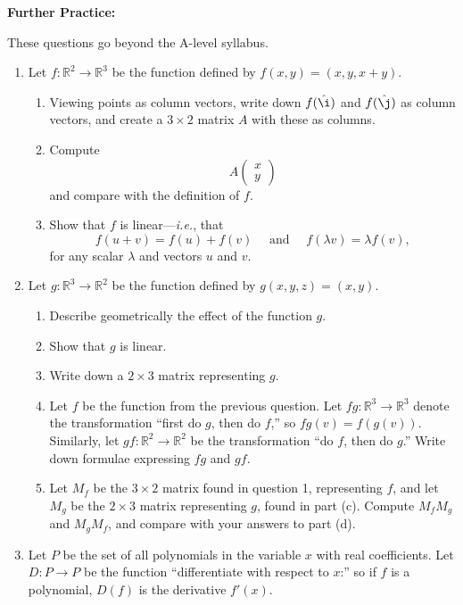 \documentclass{article}
\newcommand{\ihat}{\hat\i}
\newcommand{\jhat}{\hat\j}
\begin{document}
\clearpage


\textbf{Further Practice:}\bigskip

These questions go beyond the A-level syllabus.

\begin{enumerate}
	\item Let $f\colon\mathbb{R}^2\to\mathbb{R}^3$ be the function defined by $f(x,y)=(x,y,x+y)$.
		\begin{enumerate}
			\item Viewing points as column vectors, write down $f(\ihat)$ and $f(\jhat)$ as column vectors, and create a $3\times 2$ matrix $A$ with these as columns.
			\item Compute
				\[A\left(\begin{array}{c}x\\y\end{array}\right)\]
				and compare with the definition of $f$.
			\item Show that $f$ is linear---\textit{i.e.}, that
				\[f(u+v)=f(u)+f(v)\quad\mbox{ and }\quad f(\lambda v)=\lambda f(v),\]
				for any scalar $\lambda$ and vectors $u$ and $v$.
		\end{enumerate}
	\item Let $g\colon\mathbb{R}^3\to\mathbb{R}^2$ be the function defined by $g(x,y,z)=(x,y)$.
		\begin{enumerate}
			\item Describe geometrically the effect of the function $g$.
			\item Show that $g$ is linear.
			\item Write down a $2\times 3$ matrix representing $g$.
			\item Let $f$ be the function from the previous question. Let $fg\colon\mathbb{R}^3\to\mathbb{R}^3$ denote the transformation ``first do $g$, then do $f$,'' so $fg(v)=f(g(v))$. Similarly, let $gf\colon\mathbb{R}^2\to\mathbb{R}^2$ be the transformation ``do $f$, then do $g$.'' Write down formulae expressing $fg$ and $gf$.
			\item Let $M_f$ be the $3\times 2$ matrix found in question 1, representing $f$, and let $M_g$ be the $2\times 3$ matrix representing $g$, found in part (c). Compute $M_fM_g$ and $M_gM_f$, and compare with your answers to part (d).
		\end{enumerate}
	\item Let $P$ be the set of all polynomials in the variable $x$ with real coefficients. Let $D\colon P\to P$ be the function ``differentiate with respect to $x$:'' so if $f$ is a polynomial, $D(f)$ is the derivative $f'(x)$.

\end{enumerate}
\end{document}
